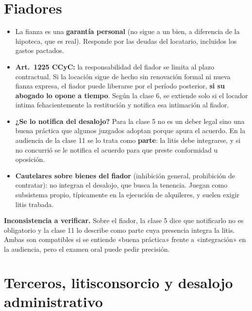 \section{Fiadores}

\begin{itemize}
  \item La fianza es una \textbf{garantía personal} (no sigue a un bien, a diferencia de la hipoteca, que es real). Responde por las deudas del locatario, incluidos los gastos pactados.
  \item \textbf{Art.\ 1225 CCyC:} la responsabilidad del fiador se limita al plazo contractual. Si la locación sigue de hecho sin renovación formal ni nueva fianza expresa, el fiador puede liberarse por el período posterior, \textbf{si su abogado lo opone a tiempo}. Según la clase 6, se extiende solo si el locador intima fehacientemente la restitución y notifica esa intimación al fiador.
  \item \textbf{¿Se lo notifica del desalojo?} Para la clase 5 no es un deber legal sino una buena práctica que algunos juzgados adoptan porque apura el acuerdo. En la audiencia de la clase 11 se lo trata como \textbf{parte}: la litis debe integrarse, y si no concurrió se le notifica el acuerdo para que preste conformidad u oposición.
  \item \textbf{Cautelares sobre bienes del fiador} (inhibición general, prohibición de contratar): no integran el desalojo, que busca la tenencia. Juegan como subsistema propio, típicamente en la ejecución de alquileres, y suelen exigir litis trabada.
\end{itemize}

\begin{important}
\textbf{Inconsistencia a verificar.} Sobre el fiador, la clase 5 dice que notificarlo no es obligatorio y la clase 11 lo describe como parte cuya presencia integra la litis. Ambas son compatibles si se entiende «buena práctica» frente a «integración» en la audiencia, pero el examen oral puede pedir precisión.
\end{important}

\section{Terceros, litisconsorcio y desalojo administrativo}

